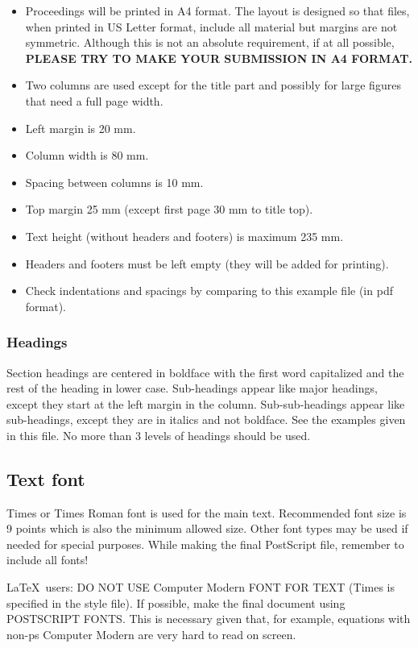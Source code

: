 \documentclass[a4paper]{article}
\begin{document}
\begin{itemize}
\item Proceedings will be printed in A4 format. The layout is designed 
so that files, when printed in US Letter format, include all material 
but margins are not symmetric. 
Although this is not an absolute requirement, if at all possible,
{\bf PLEASE TRY TO MAKE YOUR SUBMISSION IN A4 FORMAT.}
\item Two columns are used except for the title part and possibly for large 
figures that need a full page width.
\item Left margin is 20 mm.
\item Column width is 80 mm.
\item Spacing between columns is 10 mm.
\item Top margin 25 mm (except first page 30 mm to title top).
\item Text height (without headers and footers) is maximum 235 mm.
\item Headers and footers must be left empty (they will be added for 
printing).
\item Check indentations and spacings by comparing to this 
example file (in pdf format).
\end{itemize}

\subsubsection{Headings}

Section headings are centered in boldface
with the first word capitalized and the rest of the heading in 
lower case. Sub-headings appear like major headings, except they 
start at the left margin in the column.
Sub-sub-headings appear like sub-headings, except they are in italics 
and not boldface. See the examples given in this 
file. No more than 3 levels of headings should be used.

\subsection{Text font}

Times or Times Roman font is used for the main text. Recommended 
font size is 9 points which is also the minimum allowed size.
Other font types may be used if needed for 
special purposes. While making the final PostScript file, 
remember to include all fonts!

\LaTeX\ users: DO NOT USE Computer Modern FONT FOR TEXT (Times is 
specified in the style file). If possible, make the final 
document using POSTSCRIPT FONTS.
This is necessary given that, for example, equations with 
non-ps Computer Modern are very hard to read on screen.
\end{document}
